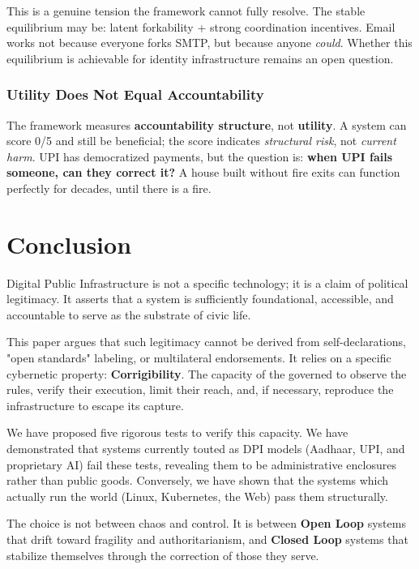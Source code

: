 \documentclass{article}
\begin{document}
This is a genuine tension the framework cannot fully resolve. The stable equilibrium may be: latent forkability + strong coordination incentives. Email works not because everyone forks SMTP, but because anyone \textit{could}. Whether this equilibrium is achievable for identity infrastructure remains an open question.

\subsubsection{Utility Does Not Equal Accountability}
\label{subsec:utility}

The framework measures \textbf{accountability structure}, not \textbf{utility}. A system can score 0/5 and still be beneficial; the score indicates \textit{structural risk}, not \textit{current harm}. UPI has democratized payments, but the question is: \textbf{when UPI fails someone, can they correct it?} A house built without fire exits can function perfectly for decades, until there is a fire.

\section{Conclusion}

Digital Public Infrastructure is not a specific technology; it is a claim of political legitimacy. It asserts that a system is sufficiently foundational, accessible, and accountable to serve as the substrate of civic life.

This paper argues that such legitimacy cannot be derived from self-declarations, "open standards" labeling, or multilateral endorsements. It relies on a specific cybernetic property: \textbf{Corrigibility}. The capacity of the governed to observe the rules, verify their execution, limit their reach, and, if necessary, reproduce the infrastructure to escape its capture.

We have proposed five rigorous tests to verify this capacity. We have demonstrated that systems currently touted as DPI models (Aadhaar, UPI, and proprietary AI) fail these tests, revealing them to be administrative enclosures rather than public goods. Conversely, we have shown that the systems which actually run the world (Linux, Kubernetes, the Web) pass them structurally.

The choice is not between chaos and control. It is between \textbf{Open Loop} systems that drift toward fragility and authoritarianism, and \textbf{Closed Loop} systems that stabilize themselves through the correction of those they serve.
\end{document}
